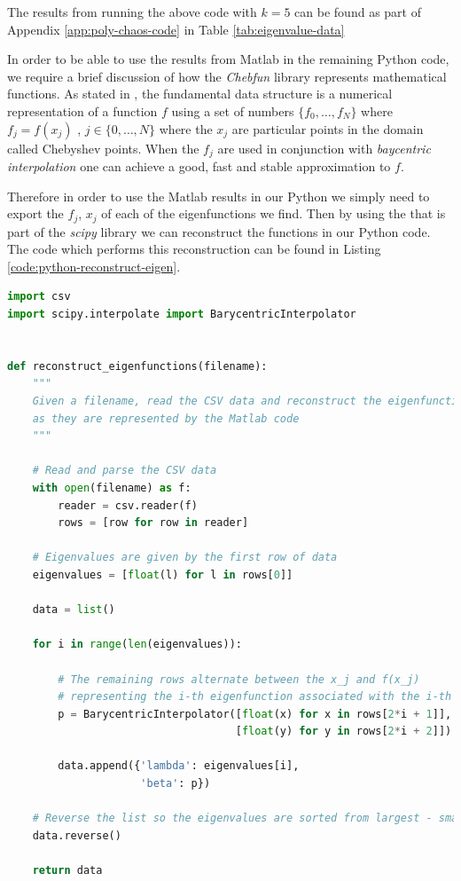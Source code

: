 The results from running the above code with $k = 5$ can be found as part of
Appendix \ref{app:poly-chaos-code} in Table \ref{tab:eigenvalue-data}

In order to be able to use the results from Matlab in the remaining Python
code, we require a brief discussion of how the \textit{Chebfun} library
represents mathematical functions. As stated in \cite{chebfun-data}, the
fundamental data structure  is a numerical representation of a
function $f$ using a set of numbers $\{f_0, \ldots, f_N\}$ where $f_j = f(x_j)$
, $j \in \{0, \ldots, N\}$ where the $x_j$ are particular points in the domain
called Chebyshev points. When the $f_j$ are used in conjunction with
\textit{baycentric interpolation} one can achieve a good, fast and stable
approximation to $f$.

Therefore in order to use the Matlab results in our Python we simply need to
export the $f_j$, $x_j$ of each of the eigenfunctions we find. Then by using
the  that is part of the \textit{scipy} library
\cite{scipy} we can reconstruct the functions in our Python code. The code
which performs this reconstruction can be found in Listing
\ref{code:python-reconstruct-eigen}.

\begin{lstlisting}[caption={Python code which reconstructs the eigenfunctions
                            we found using Matlab},
                   label={code:python-reconstruct-eigen},
                   language=Python]
import csv
import scipy.interpolate import BarycentricInterpolator


def reconstruct_eigenfunctions(filename):
    """
    Given a filename, read the CSV data and reconstruct the eigenfunctions
    as they are represented by the Matlab code
    """

    # Read and parse the CSV data
    with open(filename) as f:
        reader = csv.reader(f)
        rows = [row for row in reader]

    # Eigenvalues are given by the first row of data
    eigenvalues = [float(l) for l in rows[0]]

    data = list()

    for i in range(len(eigenvalues)):

        # The remaining rows alternate between the x_j and f(x_j)
        # representing the i-th eigenfunction associated with the i-th eigenvalue
        p = BarycentricInterpolator([float(x) for x in rows[2*i + 1]],
                                    [float(y) for y in rows[2*i + 2]])

        data.append({'lambda': eigenvalues[i],
                     'beta': p})

    # Reverse the list so the eigenvalues are sorted from largest - smallest
    data.reverse()

    return data
\end{lstlisting}

